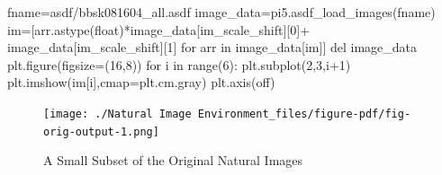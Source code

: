 \documentclass[
  letterpaper,
  DIV=11,
  numbers=noendperiod]{scrreprt}
\newenvironment{Shaded}{\begin{snugshade}}{\end{snugshade}}
\newcommand{\BuiltInTok}[1]{\textcolor[rgb]{0.00,0.23,0.31}{#1}}
\newcommand{\ControlFlowTok}[1]{\textcolor[rgb]{0.00,0.23,0.31}{#1}}
\newcommand{\DecValTok}[1]{\textcolor[rgb]{0.68,0.00,0.00}{#1}}
\newcommand{\KeywordTok}[1]{\textcolor[rgb]{0.00,0.23,0.31}{#1}}
\newcommand{\NormalTok}[1]{\textcolor[rgb]{0.00,0.23,0.31}{#1}}
\newcommand{\OperatorTok}[1]{\textcolor[rgb]{0.37,0.37,0.37}{#1}}
\newcommand{\StringTok}[1]{\textcolor[rgb]{0.13,0.47,0.30}{#1}}
\begin{document}
\begin{Shaded}
\begin{Highlighting}[]
\NormalTok{fname}\OperatorTok{=}\StringTok{\textquotesingle{}asdf/bbsk081604\_all.asdf\textquotesingle{}}
\NormalTok{image\_data}\OperatorTok{=}\NormalTok{pi5.asdf\_load\_images(fname)}
\NormalTok{im}\OperatorTok{=}\NormalTok{[arr.astype(}\BuiltInTok{float}\NormalTok{)}\OperatorTok{*}\NormalTok{image\_data[}\StringTok{\textquotesingle{}im\_scale\_shift\textquotesingle{}}\NormalTok{][}\DecValTok{0}\NormalTok{]}\OperatorTok{+}
\NormalTok{        image\_data[}\StringTok{\textquotesingle{}im\_scale\_shift\textquotesingle{}}\NormalTok{][}\DecValTok{1}\NormalTok{] }\ControlFlowTok{for}\NormalTok{ arr }\KeywordTok{in}\NormalTok{ image\_data[}\StringTok{\textquotesingle{}im\textquotesingle{}}\NormalTok{]]}
\KeywordTok{del}\NormalTok{ image\_data}
\NormalTok{plt.figure(figsize}\OperatorTok{=}\NormalTok{(}\DecValTok{16}\NormalTok{,}\DecValTok{8}\NormalTok{))}
\ControlFlowTok{for}\NormalTok{ i }\KeywordTok{in} \BuiltInTok{range}\NormalTok{(}\DecValTok{6}\NormalTok{):}
\NormalTok{    plt.subplot(}\DecValTok{2}\NormalTok{,}\DecValTok{3}\NormalTok{,i}\OperatorTok{+}\DecValTok{1}\NormalTok{)}
\NormalTok{    plt.imshow(im[i],cmap}\OperatorTok{=}\NormalTok{plt.cm.gray)}
\NormalTok{    plt.axis(}\StringTok{\textquotesingle{}off\textquotesingle{}}\NormalTok{)}
\end{Highlighting}
\end{Shaded}

\begin{figure}[H]

{\centering \texttt{[image: ./Natural Image Environment\_files/figure-pdf/fig-orig-output-1.png]}

}

\caption{\label{fig-orig}A Small Subset of the Original Natural Images}

\end{figure}
\end{document}
